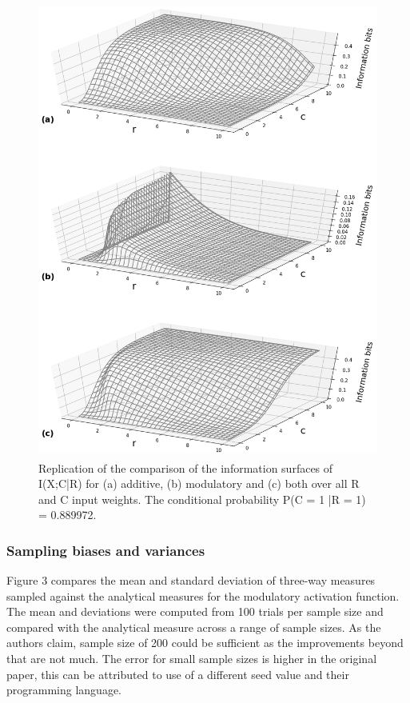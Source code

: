 \begin{figure}[H]
    \begin{center}
        \includegraphics[width=12cm,height=15cm]{figure_2.png}
    \end{center}
      \caption{Replication of the comparison of the information surfaces of I(X;C|R) for (a) additive, (b) modulatory and (c) both over all R and C input weights. The conditional probability P(C = 1 |R = 1) = 0.889972.}
\end{figure}

\subsubsection{Sampling biases and variances}

Figure 3 compares the mean and standard deviation of three-way measures sampled against the analytical measures for the modulatory activation function. The mean and deviations were computed from 100 trials per sample size and compared with the analytical measure across a range of sample sizes. As the authors claim, sample size of 200 could be sufficient as the improvements beyond that are not much. The error for small sample sizes is higher in the original paper, this can be attributed to use of a different seed value and their programming language.


